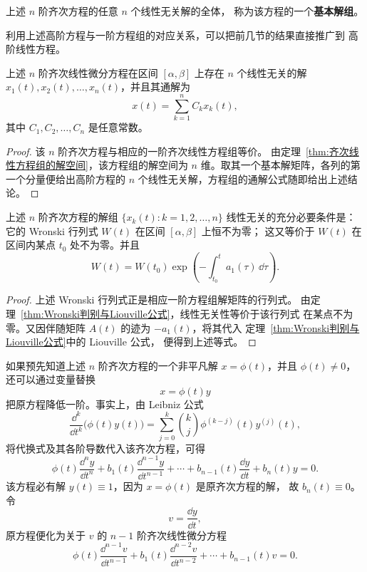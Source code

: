 \begin{definition}\label{def:高阶齐次线性方程的基本解组}
	上述 $n$ 阶齐次方程的任意 $n$ 个线性无关解的全体，
	称为该方程的一个\textbf{基本解组}。
\end{definition}

利用上述高阶方程与一阶方程组的对应关系，可以把前几节的结果直接推广到
高阶线性方程。

\begin{theorem}\label{thm:高阶齐次线性方程的通解}
	上述 $n$ 阶齐次线性微分方程在区间
	$[\alpha,\beta]$ 上存在 $n$ 个线性无关的解
	$x_1(t),x_2(t),\ldots,x_n(t)$，并且其通解为
	\[
		x(t)=\sum_{k=1}^{n}C_kx_k(t),
	\]
	其中 $C_1,C_2,\ldots,C_n$ 是任意常数。
\end{theorem}

\begin{proof}
	该 $n$ 阶齐次方程与相应的一阶齐次线性方程组等价。
	由定理~\ref{thm:齐次线性方程组的解空间}，该方程组的解空间为
	$n$ 维。取其一个基本解矩阵，各列的第一个分量便给出高阶方程的
	$n$ 个线性无关解，方程组的通解公式随即给出上述结论。
\end{proof}

\begin{theorem}\label{thm:高阶齐次线性方程的Wronski判别}
	上述 $n$ 阶齐次方程的解组
	$\{x_k(t):k=1,2,\ldots,n\}$ 线性无关的充分必要条件是：
	它的 Wronski 行列式 $W(t)$ 在区间 $[\alpha,\beta]$ 上恒不为零；
	这又等价于 $W(t)$ 在区间内某点 $t_0$ 处不为零。并且
	\[
		W(t)=W(t_0)
		\exp\left(-\int_{t_0}^{t}a_1(\tau)\,\dd\tau\right).
	\]
\end{theorem}

\begin{proof}
	上述 Wronski 行列式正是相应一阶方程组解矩阵的行列式。
	由定理~\ref{thm:Wronski判别与Liouville公式}，线性无关性等价于该行列式
	在某点不为零。又因伴随矩阵 $A(t)$ 的迹为 $-a_1(t)$，将其代入
	定理~\ref{thm:Wronski判别与Liouville公式}中的 Liouville 公式，
	便得到上述等式。
\end{proof}

如果预先知道上述 $n$ 阶齐次方程的一个非平凡解
$x=\phi(t)$，并且 $\phi(t)\neq 0$，还可以通过变量替换
\[
	x=\phi(t)y
\]
把原方程降低一阶。事实上，由 Leibniz 公式
\[
	\dfrac{\dd^k}{\dd t^k}\bigl(\phi(t)y(t)\bigr)
	=\sum_{j=0}^{k}\binom{k}{j}
	\phi^{(k-j)}(t)y^{(j)}(t),
\]
将代换式及其各阶导数代入该齐次方程，可得
\[
	\phi(t)\dfrac{\dd^ny}{\dd t^n}
	+b_1(t)\dfrac{\dd^{n-1}y}{\dd t^{n-1}}
	+\cdots
	+b_{n-1}(t)\dfrac{\dd y}{\dd t}
	+b_n(t)y=0.
\]
该方程必有解 $y(t)\equiv 1$，因为 $x=\phi(t)$ 是原齐次方程的解，
故 $b_n(t)\equiv 0$。令
\[
	v=\dfrac{\dd y}{\dd t},
\]
原方程便化为关于 $v$ 的 $n-1$ 阶齐次线性微分方程
\[
	\phi(t)\dfrac{\dd^{n-1}v}{\dd t^{n-1}}
	+b_1(t)\dfrac{\dd^{n-2}v}{\dd t^{n-2}}
	+\cdots+b_{n-1}(t)v=0.
\]

